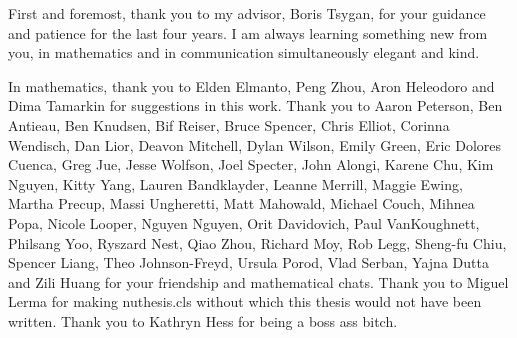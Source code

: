 First and foremost, thank you to my advisor, Boris Tsygan, for your guidance and patience for the last four years. I am always learning something new from you, in mathematics and in communication simultaneously elegant and kind. 

In mathematics, thank you to Elden Elmanto, Peng Zhou, Aron Heleodoro and Dima Tamarkin for suggestions in this work. Thank you to 
Aaron Peterson, 
Ben Antieau, 
Ben Knudsen, 
Bif Reiser, 
Bruce Spencer, 
Chris Elliot, 
Corinna Wendisch, 
Dan Lior, 
Deavon Mitchell, 
Dylan Wilson, 
Emily Green, 
Eric Dolores Cuenca, 
Greg Jue, 
Jesse Wolfson, 
Joel Specter, 
John Alongi, 
Karene Chu, 
Kim Nguyen, 
Kitty Yang, 
Lauren Bandklayder, 
Leanne Merrill, 
Maggie Ewing, 
Martha Precup, 
Massi Ungheretti, 
Matt Mahowald, 
Michael Couch, 
Mihnea Popa, 
Nicole Looper, 
Nguyen Nguyen, 
Orit Davidovich, 
Paul VanKoughnett, 
Philsang Yoo, 
Ryszard Nest, 
Qiao Zhou, 
Richard Moy, 
Rob Legg, 
Sheng-fu Chiu, 
Spencer Liang, 
Theo Johnson-Freyd, 
Ursula Porod, 
Vlad Serban, 
Yajna Dutta and 
Zili Huang for your friendship and mathematical chats. 
Thank you to Miguel Lerma for making nuthesis.cls without which this thesis would not have been written. 
Thank you to Kathryn Hess for being a boss ass bitch.